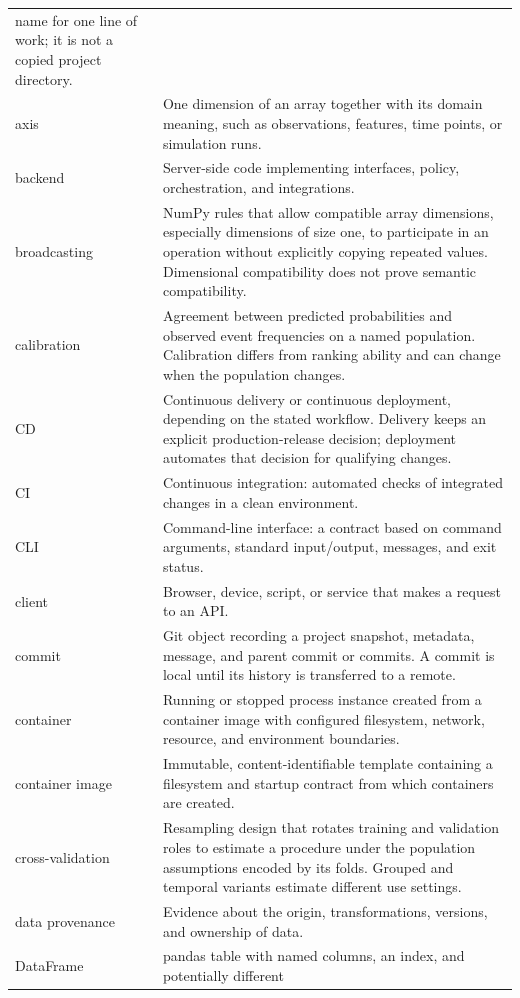 \begin{longtable}{@{}p{}p{}@{}}
name for one line of work; it is not a copied project directory. \\
axis & One dimension of an array together with its domain meaning, such as
observations, features, time points, or simulation runs. \\
backend & Server-side code implementing interfaces, policy, orchestration, and
integrations. \\
broadcasting & NumPy rules that allow compatible array dimensions, especially
dimensions of size one, to participate in an operation without explicitly
copying repeated values. Dimensional compatibility does not prove semantic
compatibility. \\
calibration & Agreement between predicted probabilities and observed event
frequencies on a named population. Calibration differs from ranking ability and
can change when the population changes. \\
CD & Continuous delivery or continuous deployment, depending on the stated
workflow. Delivery keeps an explicit production-release decision; deployment
automates that decision for qualifying changes. \\
CI & Continuous integration: automated checks of integrated changes in a clean
environment. \\
CLI & Command-line interface: a contract based on command arguments, standard
input/output, messages, and exit status. \\
client & Browser, device, script, or service that makes a request to an API. \\
commit & Git object recording a project snapshot, metadata, message, and parent
commit or commits. A commit is local until its history is transferred to a
remote. \\
container & Running or stopped process instance created from a container image
with configured filesystem, network, resource, and environment boundaries. \\
container image & Immutable, content-identifiable template containing a
filesystem and startup contract from which containers are created. \\
cross-validation & Resampling design that rotates training and validation roles
to estimate a procedure under the population assumptions encoded by its folds.
Grouped and temporal variants estimate different use settings. \\
data provenance & Evidence about the origin, transformations, versions, and
ownership of data. \\
DataFrame & pandas table with named columns, an index, and potentially different

\end{longtable}
